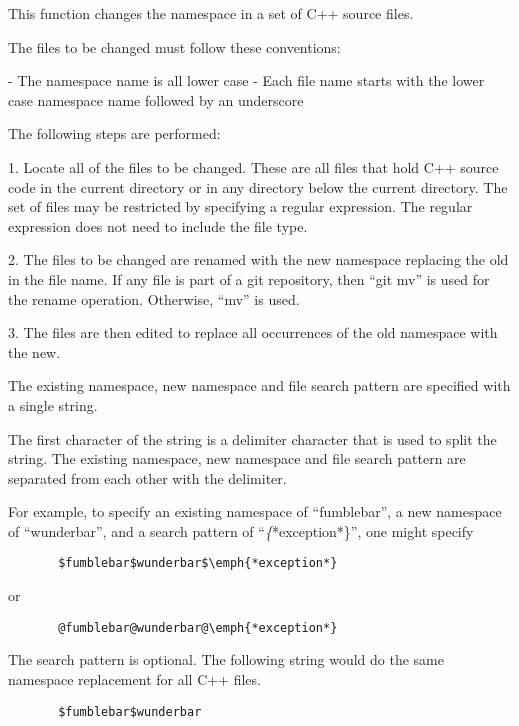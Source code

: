 \begin{doc-string}
This function changes the namespace in a set of C++ source files.

The files to be changed must follow these conventions:

 - The namespace name is all lower case
 - Each file name starts with the lower case namespace name followed by an
   underscore

The following steps are performed:

 1. Locate all of the files to be changed.  These are all files that hold C++
 source code in the current directory or in any directory below the current
 directory.  The set of files may be restricted by specifying a regular
 expression.  The regular expression does not need to include the file type.

 2. The files to be changed are renamed with the new namespace replacing the
 old in the file name.  If any file is part of a git repository, then ``git mv''
 is used for the rename operation.  Otherwise, ``mv'' is used.

 3. The files are then edited to replace all occurrences of the old namespace
 with the new.

The existing namespace, new namespace and file search pattern are specified with
a single string.

The first character of the string is a delimiter character that is used to split
the string.  The existing namespace, new namespace and file search pattern are
separated from each other with the delimiter.

For example, to specify an existing namespace of ``fumblebar'', a new namespace
of ``wunderbar'', and a search pattern of ``\emph\{*exception*\}'', one might specify

\small{\begin{verbatim}
       $fumblebar$wunderbar$\emph{*exception*}
\end{verbatim}}

or

\small{\begin{verbatim}
       @fumblebar@wunderbar@\emph{*exception*}
\end{verbatim}}

The search pattern is optional.  The following string would do the same
namespace replacement for all C++ files.

\small{\begin{verbatim}
       $fumblebar$wunderbar
\end{verbatim}}
\end{doc-string}

